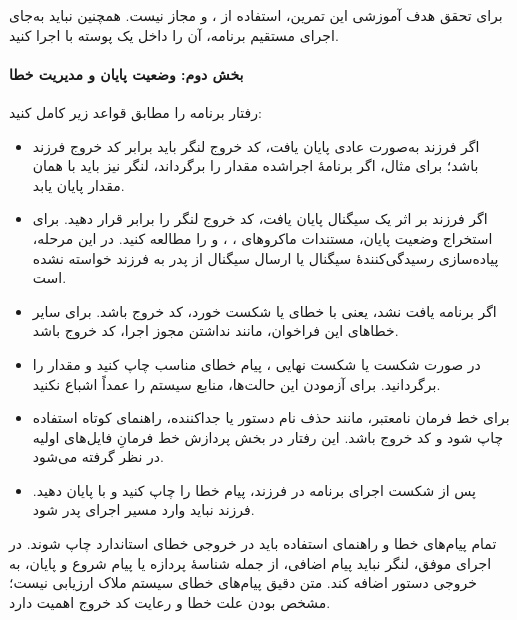 برای تحقق هدف آموزشی این تمرین، استفاده از ،
 و  مجاز نیست. همچنین
نباید به‌جای اجرای مستقیم برنامه، آن را داخل یک پوسته با
 اجرا کنید.

\paragraph{بخش دوم: وضعیت پایان و مدیریت خطا}
رفتار برنامه را مطابق قواعد زیر کامل کنید:

\begin{itemize}
  \item اگر فرزند به‌صورت عادی پایان یافت، کد خروج لنگر باید برابر کد
  خروج فرزند باشد؛ برای مثال، اگر برنامهٔ اجراشده مقدار
   را برگرداند، لنگر نیز باید با همان مقدار پایان یابد.

  \item اگر فرزند بر اثر یک سیگنال پایان یافت، کد خروج لنگر را برابر
   قرار دهید. برای استخراج وضعیت پایان،
  مستندات ماکروهای ، ،
   و  را مطالعه کنید.
  در این مرحله، پیاده‌سازی رسیدگی‌کنندهٔ سیگنال یا ارسال سیگنال از پدر به
  فرزند خواسته نشده است.

  \item اگر برنامه یافت نشد، یعنی  با خطای
   یا  شکست خورد، کد خروج
   باشد. برای سایر خطاهای این فراخوان، مانند نداشتن
  مجوز اجرا، کد خروج  باشد.

  \item در صورت شکست  یا شکست نهایی
  ، پیام خطای مناسب چاپ کنید و مقدار
   را برگردانید. برای آزمودن این حالت‌ها، منابع سیستم را
  عمداً اشباع نکنید.

  \item برای خط فرمان نامعتبر، مانند حذف نام دستور یا جداکننده،
  راهنمای کوتاه استفاده چاپ شود و کد خروج  باشد.
  این رفتار در بخش پردازش خط فرمانِ فایل‌های اولیه در نظر گرفته می‌شود.

  \item پس از شکست اجرای برنامه در فرزند، پیام خطا را چاپ کنید و با
   پایان دهید. فرزند نباید وارد مسیر اجرای پدر شود.
\end{itemize}

تمام پیام‌های خطا و راهنمای استفاده باید در خروجی خطای استاندارد
 چاپ شوند. در اجرای موفق، لنگر نباید پیام اضافی،
از جمله شناسهٔ پردازه یا پیام شروع و پایان، به خروجی دستور اضافه کند.
متن دقیق پیام‌های خطای سیستم ملاک ارزیابی نیست؛ مشخص بودن علت خطا و
رعایت کد خروج اهمیت دارد.

